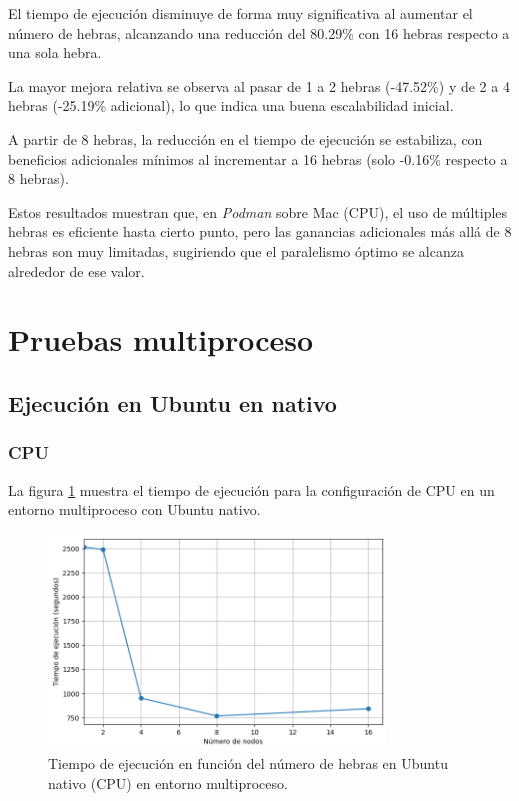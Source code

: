El tiempo de ejecución disminuye de forma muy significativa al aumentar el número de hebras, alcanzando una reducción del 80.29\% con 16 hebras respecto a una sola hebra.

La mayor mejora relativa se observa al pasar de 1 a 2 hebras (-47.52\%) y de 2 a 4 hebras (-25.19\% adicional), lo que indica una buena escalabilidad inicial.

A partir de 8 hebras, la reducción en el tiempo de ejecución se estabiliza, con beneficios adicionales mínimos al incrementar a 16 hebras (solo -0.16\% respecto a 8 hebras).

Estos resultados muestran que, en \textit{Podman} sobre Mac (CPU), el uso de múltiples hebras es eficiente hasta cierto punto, pero las ganancias adicionales más allá de 8 hebras son muy limitadas, sugiriendo que el paralelismo óptimo se alcanza alrededor de ese valor.

\section{Pruebas multiproceso}
\subsection{Ejecución en Ubuntu en nativo}
\subsubsection{CPU}

La figura \ref{fig:multi-node_ubuntu_cpu_native_time} muestra el tiempo de ejecución para la configuración de CPU en un entorno multiproceso con Ubuntu nativo.

\begin{figure}[H]
    \centering
    \includegraphics[width=0.8\textwidth]{imagenes/cap5/multi-node_ubuntu_cpu_native_time.png}
    \caption{Tiempo de ejecución en función del número de hebras en Ubuntu nativo (CPU) en entorno multiproceso.}
    \label{fig:multi-node_ubuntu_cpu_native_time}
\end{figure}

